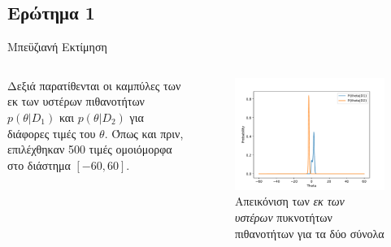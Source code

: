 \documentclass{beamer}
\begin{document}
\subsection{Ερώτημα 1}
\begin{frame}{Μπεϋζιανή Εκτίμηση}
    \begin{columns}

    
    Δεξιά παρατίθενται οι καμπύλες των εκ των υστέρων πιθανοτήτων $p(\theta|D_1)$ και $p(\theta|D_2)$ για διάφορες τιμές του $\theta$. Όπως και πριν, επιλέχθηκαν 500 τιμές ομοιόμορφα στο διάστημα $[-60,60]$. 


    \begin{figure}
        \centering
            \includegraphics[width=\textwidth]{../plots/posterior.pdf}
            \caption{Απεικόνιση των \textit{εκ των υστέρων} πυκνοτήτων πιθανοτήτων για τα δύο σύνολα}
            \label{fig:posterior}
    \end{figure}


\end{columns}
\end{frame}
\end{document}
